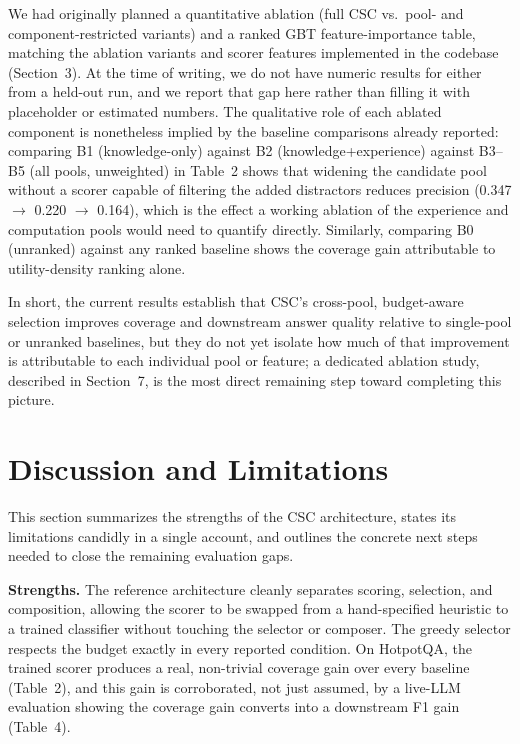 \documentclass{article}
\begin{document}
We had originally planned a quantitative ablation (full CSC vs.\ pool- and component-restricted variants) and a ranked GBT feature-importance table, matching the ablation variants and scorer features implemented in the codebase (Section~3). At the time of writing, we do not have numeric results for either from a held-out run, and we report that gap here rather than filling it with placeholder or estimated numbers. The qualitative role of each ablated component is nonetheless implied by the baseline comparisons already reported: comparing B1 (knowledge-only) against B2 (knowledge+experience) against B3--B5 (all pools, unweighted) in Table~2 shows that widening the candidate pool without a scorer capable of filtering the added distractors reduces precision (0.347 $\rightarrow$ 0.220 $\rightarrow$ 0.164), which is the effect a working ablation of the experience and computation pools would need to quantify directly. Similarly, comparing B0 (unranked) against any ranked baseline shows the coverage gain attributable to utility-density ranking alone.

In short, the current results establish that CSC's cross-pool, budget-aware selection improves coverage and downstream answer quality relative to single-pool or unranked baselines, but they do not yet isolate how much of that improvement is attributable to each individual pool or feature; a dedicated ablation study, described in Section~7, is the most direct remaining step toward completing this picture.

\section{Discussion and Limitations}

This section summarizes the strengths of the CSC architecture, states its limitations candidly in a single account, and outlines the concrete next steps needed to close the remaining evaluation gaps.

\textbf{Strengths.} The reference architecture cleanly separates scoring, selection, and composition, allowing the scorer to be swapped from a hand-specified heuristic to a trained classifier without touching the selector or composer. The greedy selector respects the budget exactly in every reported condition. On HotpotQA, the trained scorer produces a real, non-trivial coverage gain over every baseline (Table~2), and this gain is corroborated, not just assumed, by a live-LLM evaluation showing the coverage gain converts into a downstream F1 gain (Table~4).
\end{document}
